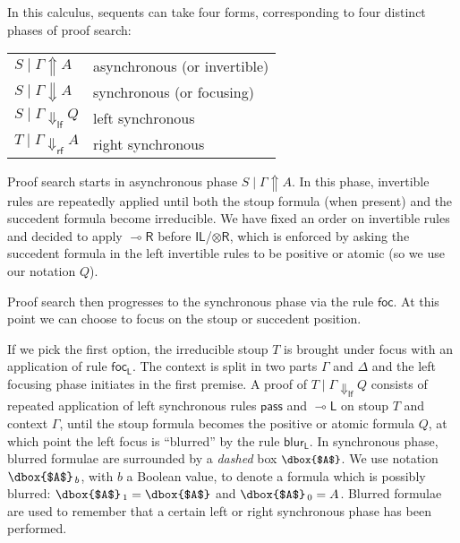 \documentclass[runningheads]{llncs}
\newcommand{\tr}{\otimes \mathsf{R}}
\newcommand{\lright}{{\multimap}\mathsf{R}}
\newcommand{\lleft}{{\multimap}\mathsf{L}}
\newcommand{\pass}{\mathsf{pass}}
\newcommand{\unitl}{\mathsf{IL}}
\newcommand{\otR}{\tr}
\newcommand{\lolliR}{\lright}
\newcommand{\lolliL}{\lleft}
\newcommand{\IL}{\unitl}
\newcommand{\ax}{\mathsf{ax}}
\newcommand{\lf}{\dn_\mathsf{lf}}%
\newcommand{\rf}{\dn_\mathsf{rf}}%
\newcommand{\up}{\Uparrow}
\newcommand{\dn}{\Downarrow}
\newcommand{\focL}{\mathsf{foc_L}}
\newcommand{\foc}{\mathsf{foc}}
\newcommand{\blurL}{\mathsf{blur_L}}
\begin{document}
In this calculus, sequents can take four forms, corresponding to four distinct phases of proof search:
\begin{center}
  \begin{tabular}{|@{\;}l@{\qquad}l@{\;}|}
    \hline
    $S \mid \Gamma \up A$ & asynchronous (or invertible) \\
    $S \mid \Gamma \dn A$ & synchronous (or focusing) \\
    $S \mid \Gamma \lf Q$ & left synchronous \\
    $T \mid \Gamma \rf A$ & right synchronous \\
 \hline
\end{tabular}
    \end{center}

Proof search starts in asynchronous phase $S \mid \Gamma \up A$. In this phase, invertible rules are repeatedly applied until both the stoup formula (when present) and the succedent formula become irreducible. We have fixed an order on invertible rules and decided to apply $\lolliR$ before $\IL$/$\otR$, which is enforced by asking the succedent formula in the left invertible rules to be positive or atomic (so we use our notation $Q$). 

Proof search then progresses to the synchronous phase via the rule $\foc$. At this point we can %
choose to focus on the stoup or succedent position.

If we pick the first option, the irreducible stoup $T$ is brought under focus with an application of rule $\focL$. The context is split in two parts $\Gamma$ and $\Delta$ and the left focusing phase initiates in the first premise. A proof of $T \mid \Gamma \lf Q$ consists of repeated application of left synchronous rules $\pass$ and $\lolliL$ on stoup $T$ and context $\Gamma$, until the stoup formula becomes the positive or atomic formula $Q$, at which point the left focus is ``blurred'' by the rule $\blurL$. In synchronous phase, blurred formulae are surrounded by a \emph{dashed} box ${\small{\dbox{$A$}}}$. We use notation {\small{$\dbox{$A$}_{\,b}$}}, with $b$ a Boolean value, to denote a formula which is possibly blurred: {\small{$\dbox{$A$}_{\,1} = \dbox{$A$}$}} and {\small{$\dbox{$A$}_{\,0} = A$}}. Blurred formulae are used to remember that a certain left or right synchronous phase has been performed.
\end{document}
